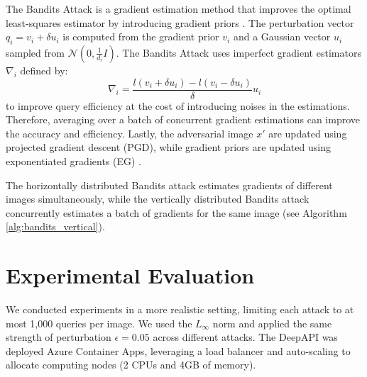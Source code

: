 The Bandits Attack is a gradient estimation method that improves the optimal least-squares estimator by introducing gradient priors \cite{ilyas2018prior}. The perturbation vector $q_i=v_i+\delta u_i$ is computed from the gradient prior $v_i$ and a Gaussian vector $u_i$ sampled from $\mathcal{N}(0, \frac{1}{d_i}I)$. The Bandits Attack uses imperfect gradient estimators $\nabla_i$ defined by: 
$$\nabla_i= \frac{l(v_i+\delta u_i)-l(v_i-\delta u_i)}{\delta} u_i$$ 
to improve query efficiency at the cost of introducing noises in the estimations. Therefore, averaging over a batch of concurrent gradient estimations can improve the accuracy and efficiency. Lastly, the adversarial image $x'$ are updated using projected gradient descent (PGD), while gradient priors are updated using exponentiated gradients (EG) \cite{pmlr-v117-ghai20a}.


The horizontally distributed Bandits attack estimates gradients of different images simultaneously, while the vertically distributed Bandits attack concurrently estimates a batch of gradients for the same image (see Algorithm \ref{alg:bandits_vertical}).



\section{Experimental Evaluation}
\label{section_experimental_evaluation}

We conducted experiments in a more realistic setting, limiting each attack to at most 1,000 queries per image. We used the $L_{\infty}$ norm and applied the same strength of perturbation $\epsilon=0.05$ across different attacks. The DeepAPI was deployed Azure Container Apps, leveraging a load balancer and auto-scaling to allocate computing nodes (2 CPUs and 4GB of memory).


